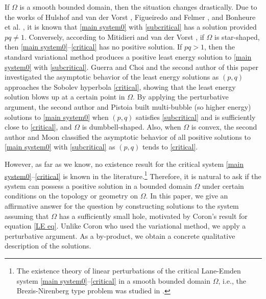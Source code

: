 \documentclass[reqno]{amsart}
\theoremstyle{remark}
\renewcommand{\(}{\left(}
\renewcommand{\)}{\right)}
\numberwithin{equation}{section}
\begin{document}
If $\Omega$ is a smooth bounded domain, then the situation changes drastically. Due to the works of Hulshof and van der Vorst \cite{HV2}, Figueiredo and Felmer \cite{FF},
and Bonheure et al. \cite{BMR}, it is known that \eqref{main system0} with \eqref{subcritical} has a solution provided $pq \ne 1$.
Conversely, according to Mitidieri \cite{Mi} and van der Vorst \cite{Va}, if $\Omega$ is star-shaped, then \eqref{main system0}--\eqref{critical} has no positive solution.
If $pq > 1$, then the standard variational method produces a positive least energy solution to \eqref{main system0} with \eqref{subcritical}.
Guerra \cite{Gu} and Choi and the second author of this paper \cite{CK} investigated the asymptotic behavior of the least energy solutions as $(p,q)$ approaches the Sobolev hyperbola \eqref{critical},
showing that the least energy solution blows up at a certain point in $\Omega$.
By applying the perturbative argument, the second author and Pistoia \cite{KP} built multi-bubble (so higher energy) solutions to \eqref{main system0}
when $(p,q)$ satisfies \eqref{subcritical} and is sufficiently close to \eqref{critical}, and $\Omega$ is dumbbell-shaped.
Also, when $\Omega$ is convex, the second author and Moon \cite{KM} classified the asymptotic behavior of all positive solutions to \eqref{main system0} with \eqref{subcritical} as $(p,q)$ tends to \eqref{critical}.

However, as far as we know, no existence result for the critical system \eqref{main system0}--\eqref{critical} is known in the literature.\footnote{
The existence theory of linear perturbations of the critical Lane-Emden system \eqref{main system0}--\eqref{critical} in a smooth bounded domain $\Omega$,
i.e., the Brezis-Nirenberg type problem was studied in \cite{HMV, Gu, CK, KP, GHP}.}
Therefore, it is natural to ask if the system can possess a positive solution in a bounded domain $\Omega$ under certain conditions on the topology or geometry on $\Omega$.
In this paper, we give an affirmative answer for the question by constructing solutions to the system
assuming that $\Omega$ has a sufficiently small hole, motivated by Coron's result \cite{Co} for equation \eqref{LE eq}.
Unlike Coron who used the variational method, we apply a perturbative argument. As a by-product, we obtain a concrete qualitative description of the solutions.
\end{document}
